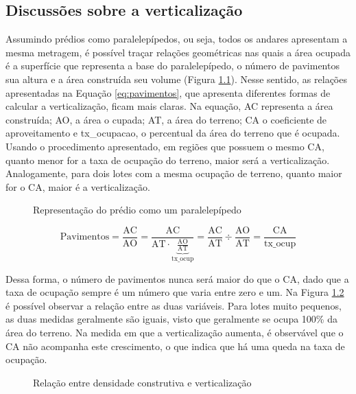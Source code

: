 \begin{apendicesenv}

\partapendices

\chapter{Discussões sobre a verticalização}
\label{appendix:verticalizacao}

Assumindo prédios como paralelepípedos, ou seja, todos os andares apresentam a mesma metragem, é possível traçar relações geométricas nas quais a área ocupada é a superfície que representa a base do paralelepípedo, o número de pavimentos sua altura e a área construída seu volume (Figura \ref{fig:desenho}). Nesse sentido, as relações apresentadas na Equação \ref{eq:pavimentos}, que apresenta diferentes formas de calcular a verticalização, ficam mais claras. Na equação, AC representa a área construída; AO, a área o cupada; AT, a área do terreno; CA o coeficiente de aproveitamento e tx\_ocupacao, o percentual da área do terreno que é ocupada. Usando o procedimento apresentado, em regiões que possuem o mesmo CA, quanto menor for a taxa de ocupação do terreno, maior será a verticalização. Analogamente, para dois lotes com a mesma ocupação de terreno, quanto maior for o CA, maior é a verticalização.

\begin{figure}[h]
    \centering
    \caption{Representação do prédio como um paralelepípedo}
    \label{fig:desenho}
\end{figure}

\begin{equation}
    \text{Pavimentos}=\frac{\text{AC}}{\text{AO}}=\frac{\text{AC}}{\text{AT}\cdot\underbrace{\frac{\text{AO}}{\text{AT}}}_\text{tx\_ocup}}=\frac{\text{AC}}{\text{AT}}\div\frac{\text{AO}}{\text{AT}}=\frac{\text{CA}}{\text{tx\_ocup}}
    \label{eq:pavimentos}
\end{equation}
    
Dessa forma, o número de pavimentos nunca será maior do que o CA, dado que a taxa de ocupação sempre é um número que varia entre zero e um. Na Figura \ref{fig:ca-vert} é possível observar a relação entre as duas variáveis. Para lotes muito pequenos, as duas medidas geralmente são iguais, visto que geralmente se ocupa 100\% da área do terreno. Na medida em que a verticalização aumenta, é observável que o CA não acompanha este crescimento, o que indica que há uma queda na taxa de ocupação.

\begin{figure}
    \centering
    \caption{Relação entre densidade construtiva e verticalização}
    \label{fig:ca-vert}
\end{figure}


\end{apendicesenv}
    
    